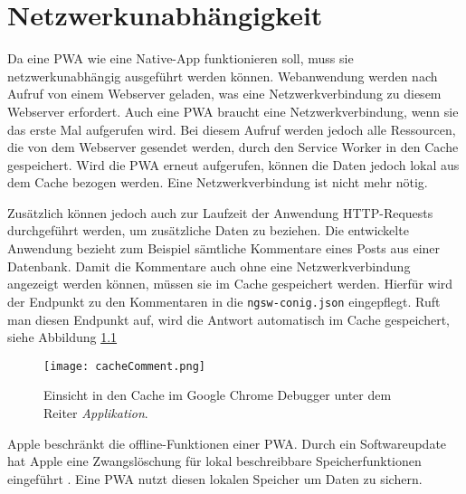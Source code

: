 \chapter{Netzwerkunabhängigkeit}

Da eine PWA wie eine Native-App funktionieren soll, muss sie netzwerkunabhängig ausgeführt werden können. Webanwendung werden nach Aufruf von einem Webserver geladen, was eine Netzwerkverbindung zu diesem Webserver erfordert. Auch eine PWA braucht eine Netzwerkverbindung, wenn sie das erste Mal aufgerufen wird. Bei diesem Aufruf werden jedoch alle Ressourcen, die von dem Webserver gesendet werden, durch den Service Worker in den Cache gespeichert. 
Wird die PWA erneut aufgerufen, können die Daten jedoch lokal aus dem Cache bezogen werden. Eine Netzwerkverbindung ist nicht mehr nötig. 

Zusätzlich können jedoch auch zur Laufzeit der Anwendung HTTP-Requests durchgeführt werden, um zusätzliche Daten zu beziehen. Die entwickelte Anwendung bezieht zum Beispiel sämtliche Kommentare eines Posts aus einer Datenbank. 
Damit die Kommentare auch ohne eine Netzwerkverbindung angezeigt werden können, müssen sie im Cache gespeichert werden. Hierfür wird der Endpunkt zu den Kommentaren in die \texttt{ngsw-conig.json} eingepflegt. 
Ruft man diesen Endpunkt auf, wird die Antwort automatisch im Cache gespeichert, siehe Abbildung \ref{img:cacheComment}

\begin{figure}[!htb]
    \centering
    \texttt{[image: cacheComment.png]}
    \caption{Einsicht in den Cache im Google Chrome Debugger unter dem Reiter \textit{Applikation}.}
    \label{img:cacheComment}
\end{figure}

Apple beschränkt die offline-Funktionen einer PWA. Durch ein Softwareupdate hat Apple eine Zwangslöschung für lokal beschreibbare Speicherfunktionen eingeführt \cite{t3n2020}. Eine PWA nutzt diesen lokalen Speicher um Daten zu sichern.